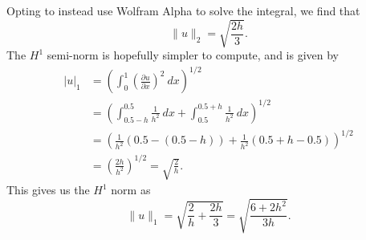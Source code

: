 \begin{solution}
    Opting to instead use Wolfram Alpha to solve the integral, we find that
    \begin{equation*}
        \lVert u \rVert_2 = \sqrt{\frac{2h}{3}}.
    \end{equation*}
    The $H^1$ semi-norm is hopefully simpler to compute, and is given by
    \begin{align*}
        \lvert u \rvert_1 &= \left( \int_{0}^{1} \left( \frac{\partial u}{\partial x} \right)^2 \ dx \right)^{1/2} \\
        &= \left( \int_{0.5 - h}^{0.5} \frac{1}{h^2} \ dx + \int_{0.5}^{0.5 + h} \frac{1}{h^2} \ dx \right)^{1/2} \\
        &= \left( \frac{1}{h^2} \left( 0.5 - (0.5 - h) \right) + \frac{1}{h^2} \left( 0.5 + h - 0.5 \right) \right)^{1/2} \\
        &= \left( \frac{2h}{h^2} \right)^{1/2} = \sqrt{\frac{2}{h}}.
    \end{align*}
    This gives us the $H^1$ norm as
    \begin{equation*}
        \lVert u \rVert_1 = \sqrt{\frac{2}{h} + \frac{2h}{3}} = \sqrt{\frac{6 + 2h^2}{3h}}.
    \end{equation*}
\end{solution}